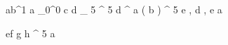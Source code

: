 \begin{eqcode}{a}{b}{^1}{}
  a \gets {}_0^0 \lend
  c \gets d _ 5 ^ 5 \lend
  d \gets \genar \limits ^ { a } ( b ) ^ 5 \lend
  e , d , e  \lend
  a \gets {} \lend
\end{eqcode}


\begin{eqcode}{e}{f}{}{}
  g \gets h ^ 5 \lend
  a  \lend
\end{eqcode}
